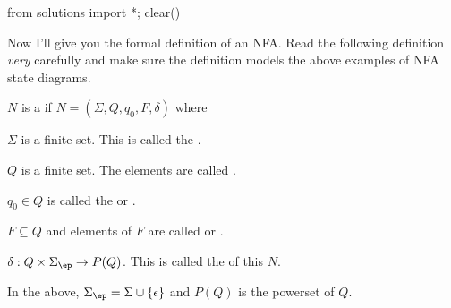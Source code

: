 \begin{python0}
from solutions import *; clear()
\end{python0}

Now I'll give you the formal definition of an NFA.
Read the following
definition \textit{very} carefully and make sure the definition models
the above examples of NFA state diagrams.

\begin{defn}
  $N$ is a
  if $N =
  (\Sigma,Q,q_0,F,\delta)$ where
  \begin{tightlist}
  \item $\Sigma$ is a finite set. This is called the
    .
  \item $Q$ is a finite set. The elements are called
    .
  \item $q_0 \in Q$ is called the
    or
    \tinysidebarskip{}\sidebarskip{0pt}.
  \item $F \subseteq Q$ and elements of $F$ are called
    or
    \tinysidebarskip{}\sidebarskip{0pt}.
  \item $\delta : Q \times \Sigma_\ep \rightarrow P(Q)$.
    This is called the 
    of this $N$.
  \end{tightlist}
  In the above, $\Sigma_\ep = \Sigma \cup \{\epsilon\}$
  and $P(Q)$ is the powerset of $Q$.
\end{defn}









